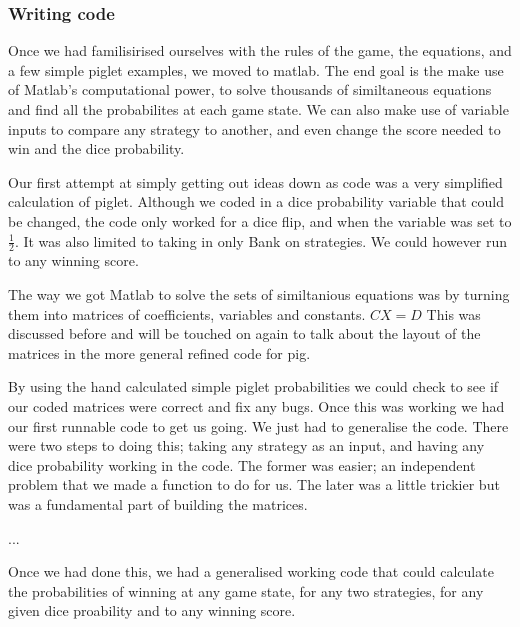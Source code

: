 \documentclass[a4paper,titlepage]{article}
\begin{document}
\subsubsection{Writing code}


Once we had familisirised ourselves with the rules of the game, the equations, and
a few simple piglet examples, we moved to matlab.
The end goal is the make use of Matlab's computational power, to solve thousands of
similtaneous equations and find all the probabilites at each game state.
We can also make use of variable inputs to compare any strategy to another, and
even change the score needed to win and the dice probability.

Our first attempt at simply getting out ideas down as code was a very simplified
calculation of piglet. Although we coded in a dice probability variable that could be changed,
the code only worked for a dice flip, and when the variable was set to $\frac{1}{2}$.
It was also limited to taking in only Bank on strategies.
We could however run to any winning score.

The way we got Matlab to solve the sets of similtanious equations was by turning them into
matrices of coefficients, variables and constants. $CX=D$ This was discussed before
and will be touched on again to talk about the layout of the matrices in the more general
refined code for pig.

By using the hand calculated simple piglet probabilities we could check to see if our
coded matrices were correct and fix any bugs. Once this was working we had our first
runnable code to get us going. We just had to generalise the code.
There were two steps to doing this; taking any strategy as an input, and having any
dice probability working in the code. The former was easier; an independent problem that we
made a function to do for us. The later was a little trickier but was a fundamental part
of building the matrices.



...

Once we had done this, we had a generalised working code that could calculate the
probabilities of winning at any game state, for any two strategies, for any given
dice proability and to any winning score.
\end{document}

